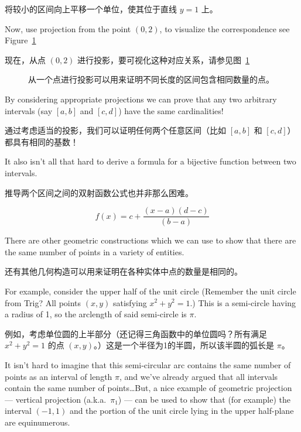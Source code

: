 将较小的区间向上平移一个单位，使其位于直线 $y = 1$ 上。

Now, use projection
from the point $(0, 2)$, to visualize the correspondence
see Figure~\ref{fig:equiv_intervals}

现在，从点 $(0, 2)$ 进行投影，要可视化这种对应关系，请参见图~\ref{fig:equiv_intervals}

\begin{figure}[!hbtp]
    
    \caption[Equivalent intervals.]{Projection from a point can be %
        used to show that intervals of %
        different lengths contain the same number of points.}
    \caption[等价区间。]{从一个点进行投影可以用来证明不同长度的区间包含相同数量的点。}
    \label{fig:equiv_intervals}
\end{figure}

By considering appropriate projections we can prove that any two arbitrary
intervals (say $[a, b]$ and $[c, d]$) have the same cardinalities!

通过考虑适当的投影，我们可以证明任何两个任意区间（比如 $[a, b]$ 和 $[c, d]$）都具有相同的基数！

It also
isn't all that hard to derive a formula for a bijective function between two
intervals.

推导两个区间之间的双射函数公式也并非那么困难。

\[ f(x) = c + \frac{(x - a)(d - c)}{(b - a)} \]

There are other geometric constructions which we can use to show that
there are the same number of points in a variety of entities.

还有其他几何构造可以用来证明在各种实体中点的数量是相同的。

For example,
consider the upper half of the unit circle (Remember the unit circle from
Trig?  All points $(x, y)$ satisfying $x^2 + y^2 = 1$.)  This is a
semi-circle having a radius of 1, so the arclength of said semi-circle
is $\pi$.

例如，考虑单位圆的上半部分（还记得三角函数中的单位圆吗？所有满足 $x^2 + y^2 = 1$ 的点 $(x, y)$。）这是一个半径为1的半圆，所以该半圆的弧长是 $\pi$。

It isn't hard to imagine
that this semi-circular arc contains the same number of points as an interval
of length $\pi$, and we've already argued that all intervals contain the same
number of points\ldots   But, a nice example of geometric projection ---
vertical projection (a.k.a.\ $\pi_1$) ---  can be used to show that
(for example) the interval
$(-1, 1)$ and the portion of the unit circle lying in the upper
half-plane are equinumerous.

